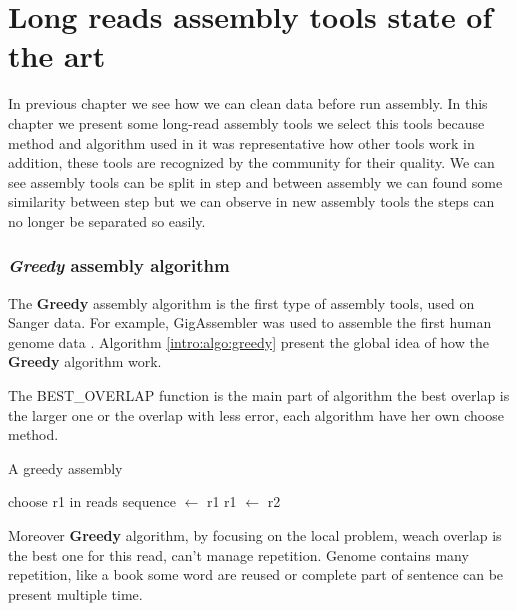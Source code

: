 \documentclass[main]{subfiles}
\begin{document}
\chapter{Long reads assembly tools state of the art}\label{chapter:sota}

In previous chapter we see how we can clean data before run assembly. In this chapter we present some long-read assembly tools we select this tools because method and algorithm used in it was representative how other tools work in addition, these tools are recognized by the community for their quality. We can see assembly tools can be split in step and between assembly we can found some similarity between step but we can observe in new assembly tools the steps can no longer be separated so easily.



\subsection{\textit{Greedy} assembly algorithm}

The \textbf{Greedy} assembly algorithm is the first type of assembly tools, used on Sanger data. For example, GigAssembler was used to assemble the first human genome data \cite{GigAssembler}. Algorithm \ref{intro:algo:greedy} present the global idea of how the \textbf{Greedy} algorithm work.

The BEST\_OVERLAP function is the main part of algorithm the best overlap is the larger one or the overlap with less error, each algorithm have her own choose method.

\begin{algorithm}[ht]
    \caption{A greedy assembly}
    \begin{algorithmic}[1]
        \State choose r1 in reads
        \State sequence $\leftarrow$ r1
            \State {}
            \State {}
            \State r1 $\leftarrow$ r2
        \EndWhile
    \EndFunction
    \end{algorithmic}
    \label{intro:algo:greedy}
\end{algorithm}

Moreover \textbf{Greedy} algorithm, by focusing on the local problem, weach overlap is the best one for this read, can't manage repetition. Genome contains many repetition, like a book some word are reused or complete part of sentence can be present multiple time.
\end{document}
